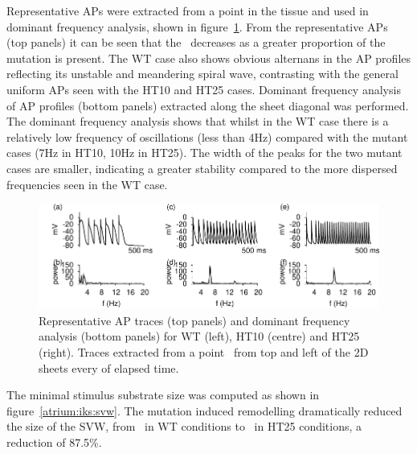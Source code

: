Representative APs were extracted from a point in the tissue and used in
dominant frequency analysis, shown in figure~\ref{atrium:iks:twodfreq}.
From the representative APs (top panels) it can be seen that the \apd\ decreases
as a greater proportion of the mutation is present.
The WT case also shows obvious alternans in the AP profiles reflecting its
unstable and meandering spiral wave, contrasting with the general uniform APs
seen with the HT10 and HT25 cases.
Dominant frequency analysis of AP profiles (bottom panels) extracted along the
sheet diagonal was performed.
The dominant frequency analysis shows that whilst in the WT case there is a
relatively low frequency of oscillations (less than \unit{4}{Hz}) compared with
the mutant cases (\unit{7}{Hz} in HT10, \unit{10}{Hz} in HT25).
The width of the peaks for the two mutant cases are smaller, indicating a
greater stability compared to the more dispersed frequencies seen in the WT
case.

\begin{figure}
\includegraphics{figures/atrium/iks/figures/05_2D_freq}
\caption[Frequency of extracted APs from 2D sheets with S140G mutation]{
\label{atrium:iks:twodfreq}
Representative AP traces (top panels) and dominant frequency analysis (bottom
panels) for WT (left), HT10 (centre) and HT25 (right).  Traces extracted from a
point \ from top and left of the 2D sheets every  of elapsed time.
}
\end{figure}

The minimal stimulus substrate size was computed as shown in
figure~\ref{atrium:iks:svw}.
The mutation induced remodelling dramatically reduced the size of the SVW, from
\ in WT conditions to \ in HT25 conditions, a reduction of
87.5\%.

